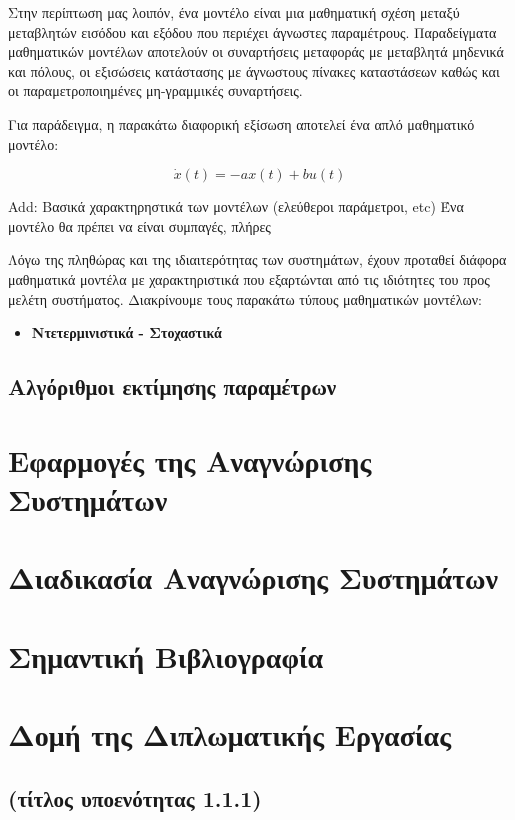 Στην περίπτωση μας λοιπόν, ένα μοντέλο είναι μια μαθηματική σχέση μεταξύ μεταβλητών εισόδου και εξόδου που περιέχει άγνωστες παραμέτρους. Παραδείγματα μαθηματικών μοντέλων αποτελούν οι συναρτήσεις μεταφοράς με μεταβλητά μηδενικά και πόλους, οι εξισώσεις κατάστασης με άγνωστους πίνακες καταστάσεων καθώς και οι παραμετροποιημένες μη-γραμμικές συναρτήσεις.

Για παράδειγμα, η παρακάτω διαφορική εξίσωση αποτελεί ένα απλό μαθηματικό μοντέλο:

\begin{equation}
	\dot{x}(t) = -a x(t) + b u(t)
\end{equation}





Add: Βασικά χαρακτηρηστικά των μοντέλων (ελεύθεροι παράμετροι, etc)
Ένα μοντέλο θα πρέπει να είναι συμπαγές, πλήρες 

Λόγω της πληθώρας και της ιδιαιτερότητας των συστημάτων, έχουν προταθεί διάφορα μαθηματικά μοντέλα με χαρακτηριστικά που εξαρτώνται από τις ιδιότητες του προς μελέτη συστήματος. Διακρίνουμε τους παρακάτω τύπους μαθηματικών μοντέλων:

\begin{itemize}
	\item{ \textbf{Ντετερμινιστικά - Στοχαστικά} }
\end{itemize}

\subsection{Αλγόριθμοι εκτίμησης παραμέτρων}


\section{Εφαρμογές της Αναγνώρισης Συστημάτων}

\section{Διαδικασία Αναγνώρισης Συστημάτων}

\section{Σημαντική Βιβλιογραφία}

\section{Δομή της Διπλωματικής Εργασίας}

\subsection{(τίτλος υποενότητας 1.1.1)}


